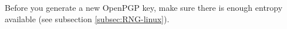 
Before you generate a new OpenPGP key, make sure there is enough entropy available (see subsection \ref{subsec:RNG-linux}).












